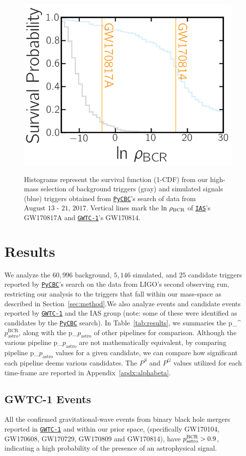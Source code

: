 \documentclass[%
 nofootinbib,
 amsmath,amssymb,
 aps,
 twocolumn,
 superscriptaddress
]{revtex4-2}
\newcommand{\pycbc}{{\sc \href{https://pycbc.org/}{\texttt{PyCBC}}}\xspace}
\newcommand{\GWTC}{{\sc \href{https://ui.adsabs.harvard.edu/abs/2019PhRvX...9c1040A/abstract}{\texttt{GWTC-1}}}\xspace}
\newcommand{\IAS}{{\sc \href{https://ui.adsabs.harvard.edu/abs/2020PhRvD.101h3030V/abstract}{\texttt{IAS}}}\xspace}
\newcommand{\fancytext}[1]{{\relax\ifmmode#1\else $#1$\fi}\xspace}
\newcommand{\mathcmd}[1]{{\sc \relax\ifmmode#1\else $#1$\fi}\xspace}
\newcommand{\bcr}{\mathcmd{\rho_\text{BCR}}}
\newcommand{\pastro}{\fancytext{p_\text{astro}}}
\newcommand{\pastrobcr}{\fancytext{p_\text{astro}^{\text{BCR}}}}
\begin{document}
\begin{figure}[!ht]
{\centering \includegraphics[width=0.85\linewidth]{images/reweighted_bcr_cdf_smaller_legend.png} }
\caption[BCR distribution example]{Histograms represent the survival function (1-CDF) from our high-mass selection of background triggers (gray) and simulated signals (blue) triggers obtained from \pycbc's search of data from $\text{August 13 - 21, 2017}$. Vertical lines mark the $\text{ln}\ \bcr$ of \IAS's GW170817A and \GWTC's GW170814.}\label{fig:bcrCdf}
\end{figure}


\section{\label{sec:Results}Results}


We analyze the $60,996$ background, $5,146$ simulated, and $25$ candidate triggers reported by \pycbc's search on the data from LIGO's second observing run, restricting our analysis to the triggers that fall within our mass-space as described in Section~\ref{sec:method}.We also analyze events and candidate events reported by \GWTC and the IAS group (note: some of these were identified as candidates by the \pycbc search). In Table~\ref{tab:results}, we summaries the \pastrobcr, along with the \pastro of other pipelines for comparison. Although the various pipeline \pastro are not mathematically equivalent, by comparing pipeline \pastro values for a given candidate, we can compare how significant each pipeline deems various candidates. The $P^S$ and $P^G$ values utilized for each time-frame are reported in Appendix~\ref{apdx:alphabeta}.

\subsection{GWTC-1 Events}
All the confirmed gravitational-wave events from binary black hole mergers reported in \GWTC and within our prior space, (specifically GW170104, GW170608, GW170729, GW170809 and GW170814), have $\pastrobcr>0.9$, indicating a high probability of the presence of an astrophysical signal. 
\end{document}
